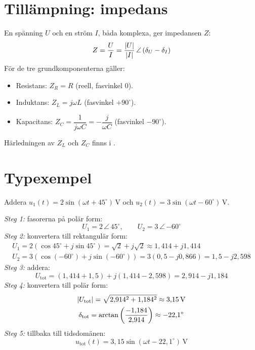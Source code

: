 \section{Tillämpning: impedans}
\label{c17:sec:impedans}
En spänning $U$ och en ström $I$, båda komplexa, ger impedansen $Z$:
\[
  Z = \frac{U}{I} = \frac{\lvert U\rvert}{\lvert I\rvert}\,\angle\,(\delta_U - \delta_I)
\]
För de tre grundkomponenterna gäller:
\begin{itemize}
  \item Resistans: $Z_R = R$ (reell, fasvinkel $0$).
  \item Induktans: $Z_L = j\omega L$ (fasvinkel $+90^{\circ}$).
  \item Kapacitans: $Z_C = \dfrac{1}{j\omega C} = -\dfrac{j}{\omega C}$
    (fasvinkel $-90^{\circ}$).
\end{itemize}
Härledningen av $Z_L$ och $Z_C$ finns i .

\section{Typexempel}
\label{c17:sec:typexempel}

\begin{exempel}[Fasoraddition]
Addera $u_1(t) = 2\sin(\omega t + 45^{\circ})\,\text{V}$ och
$u_2(t) = 3\sin(\omega t - 60^{\circ})\,\text{V}$.

\noindent\emph{Steg 1:} fasorerna på polär form:
\[
  U_1 = 2\,\angle\,45^{\circ}, \qquad U_2 = 3\,\angle\,{-60^{\circ}}
\]
\emph{Steg 2:} konvertera till rektangulär form:
\begin{gather*}
  U_1 = 2(\cos 45^{\circ} + j\sin 45^{\circ}) = \sqrt{2} + j\sqrt{2} \approx 1{,}414 + j1{,}414 \\
  U_2 = 3(\cos(-60^{\circ}) + j\sin(-60^{\circ})) = 3(0{,}5 - j0{,}866) = 1{,}5 - j2{,}598
\end{gather*}
\emph{Steg 3:} addera:
\[
  U_{\text{tot}} = (1{,}414 + 1{,}5) + j(1{,}414 - 2{,}598) = 2{,}914 - j1{,}184
\]
\emph{Steg 4:} konvertera till polär form:
\begin{gather*}
  \lvert U_{\text{tot}}\rvert = \sqrt{2{,}914^2 + 1{,}184^2} \approx 3{,}15\,\text{V} \\
  \delta_{\text{tot}} = \arctan\left(\frac{-1{,}184}{2{,}914}\right) \approx -22{,}1^{\circ}
\end{gather*}
\emph{Steg 5:} tillbaka till tidsdomänen:
\[
  u_{\text{tot}}(t) = 3{,}15\sin(\omega t - 22{,}1^{\circ})\,\text{V}
\]
\end{exempel}

